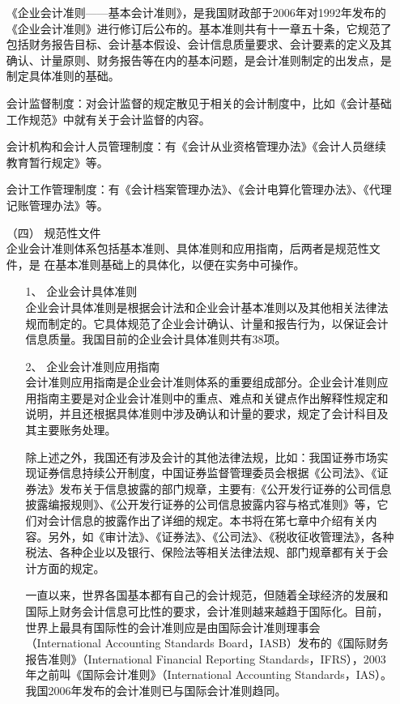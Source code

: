 \begin{enumerate}
						《企业会计准则——基本会计准则》，是我国财政部于2006年对1992年发布的《企业会计准则》进行修订后公布的。基本准则共有十一章五十条，它规范了包括财务报告目标、会计基本假设、会计信息质量要求、会计要素的定义及其确认、计量原则、财务报告等在内的基本问题，是会计准则制定的出发点，是制定具体准则的基础。
						
						会计监督制度：对会计监督的规定散见于相关的会计制度中，比如《会计基础工作规范》中就有关于会计监督的内容。
						
						会计机构和会计人员管理制度：有《会计从业资格管理办法》《会计人员继续教育暂行规定》等。
						
						会计工作管理制度：有《会计档案管理办法》、《会计电算化管理办法》、《代理记账管理办法》等。
					\item[（四）] 规范性文件 \\
						企业会计准则体系包括基本准则、具体准则和应用指南，后两者是规范性文件，是 在基本准则基础上的具体化，以便在实务中可操作。
						\begin{enumerate}
							\item[1、] 企业会计具体准则 \\
								企业会计具体准则是根据会计法和企业会计基本准则以及其他相关法律法规而制定的。它具体规范了企业会计确认、计量和报告行为，以保证会计信息质量。我国目前的企业会计具体准则共有38项。

							\item[2、] 企业会计准则应用指南 \\
								会计准则应用指南是企业会计准则体系的重要组成部分。企业会计准则应用指南主要是对企业会计准则中的重点、难点和关键点作出解释性规定和说明，并且还根据具体准则中涉及确认和计量的要求，规定了会计科目及其主要账务处理。
								
								除上述之外，我国还有涉及会计的其他法律法规，比如：我国证券市场实现证券信息持续公开制度，中国证券监督管理委员会根据《公司法》、《证券法》发布关于信息披露的部门规章，主要有:《公开发行证券的公司信息披露编报规则》、《公开发行证券的公司信息披露内容与格式准则》等，它们对会计信息的披露作出了详细的规定。本书将在笫七章中介绍有关内容。另外，如《审计法》、《证券法》、《公司法》、《税收征收管理法》，各种税法、各种企业以及银行、保险法等相关法律法规、部门规章都有关于会计方面的规定。
								
								一直以来，世界各国基本都有自己的会计规范，但随着全球经济的发展和国际上财务会计信息可比性的要求，会计准则越来越趋于国际化。目前，世界上最具有国际性的会计准则应是由国际会计准则理事会（International Accounting Standards Board，IASB）发布的《国际财务报告准则》（International Financial Reporting Standards，IFRS），2003年之前叫《国际会计准则》（International Accounting Standards，IAS）。我国2006年发布的会计准则已与国际会计准则趋同。

						\end{enumerate}
				\end{enumerate}

